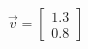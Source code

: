 \documentclass[preview]{standalone}
\begin{document}
\begin{align*}
\vec{v}=\begin{bmatrix}1.3\\0.8\end{bmatrix}
\end{align*}
\end{document}
